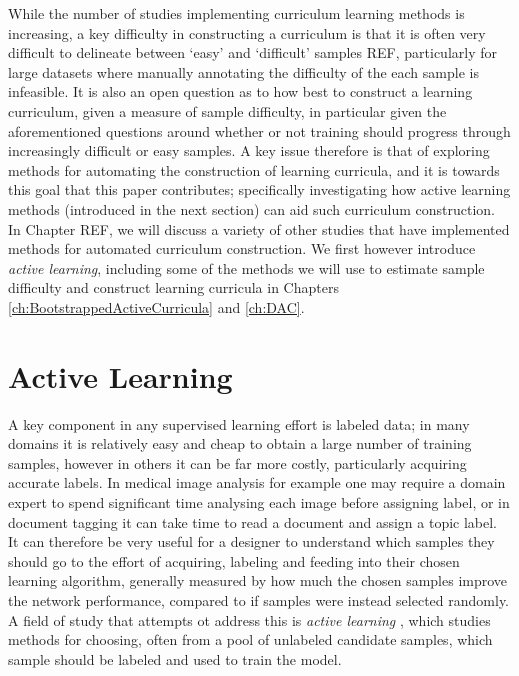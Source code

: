 While the number of studies implementing curriculum learning methods is increasing, a key difficulty in constructing a curriculum is that it is often very difficult to delineate between `easy' and `difficult' samples REF, particularly for large datasets where manually annotating the difficulty of the each sample is infeasible. It is also an open question as to how best to construct a learning curriculum, given a measure of sample difficulty, in particular given the aforementioned questions around whether or not training should progress through increasingly difficult or easy samples. A key issue therefore is that of exploring methods for automating the construction of learning curricula, and it is towards this goal that this paper contributes; specifically investigating how active learning methods (introduced in the next section) can aid such curriculum construction. In Chapter REF, we will discuss a variety of other studies that have implemented methods for automated curriculum construction. We first however introduce \textit{active learning}, including some of the methods we will use to estimate sample difficulty and construct learning curricula in Chapters \ref{ch:BootstrappedActiveCurricula} and \ref{ch:DAC}.


\section{Active Learning}\label{Background_ActiveLearning}
A key component in any supervised learning effort is labeled data; in many domains it is relatively easy and cheap to obtain a large number of training samples, however in others it can be far more costly, particularly acquiring accurate labels. In medical image analysis for example one may require a domain expert to spend significant time analysing each image before assigning label, or in document tagging it can take time to read a document and assign a topic label. It can therefore be very useful for a designer to understand which samples they should go to the effort of acquiring, labeling and feeding into their chosen learning algorithm, generally measured by how much the chosen samples improve the network performance, compared to if samples were instead selected randomly. A field of study that attempts ot address this is \textit{active learning} \cite{settles2012active} \cite{cohn1994improving} \cite{cohn1996active}, which studies methods for choosing, often from a pool of unlabeled candidate samples, which sample should be labeled and used to train the model.

